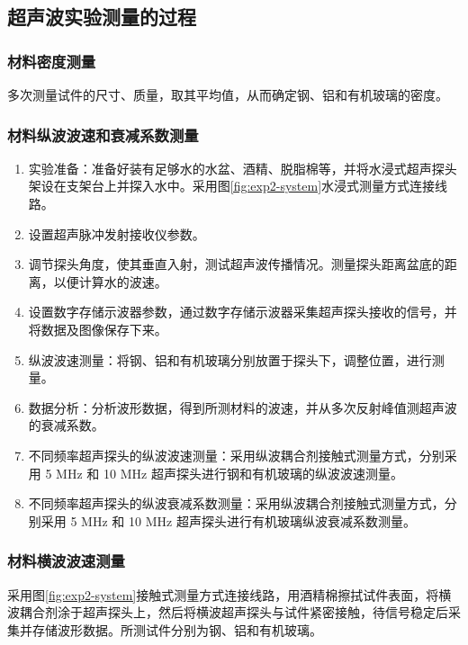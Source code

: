 \documentclass[UTF8,a4paper,12pt]{ctexart}
\numberwithin{equation}{section}
\begin{document}
\subsection{超声波实验测量的过程}
\subsubsection{材料密度测量}
多次测量试件的尺寸、质量，取其平均值，从而确定钢、铝和有机玻璃的密度。

\subsubsection{材料纵波波速和衰减系数测量}
\begin{enumerate}
  \item 实验准备：准备好装有足够水的水盆、酒精、脱脂棉等，并将水浸式超声探头架设在支架台上并探入水中。采用图\ref{fig:exp2-system}水浸式测量方式连接线路。
  \item 设置超声脉冲发射接收仪参数。
  \item 调节探头角度，使其垂直入射，测试超声波传播情况。测量探头距离盆底的距离，以便计算水的波速。
  \item 设置数字存储示波器参数，通过数字存储示波器采集超声探头接收的信号，并将数据及图像保存下来。
  \item 纵波波速测量：将钢、铝和有机玻璃分别放置于探头下，调整位置，进行测量。
  \item 数据分析：分析波形数据，得到所测材料的波速，并从多次反射峰值测超声波的衰减系数。
  \item 不同频率超声探头的纵波波速测量：采用纵波耦合剂接触式测量方式，分别采用 5 MHz 和 10 MHz 超声探头进行钢和有机玻璃的纵波波速测量。
  \item 不同频率超声探头的纵波衰减系数测量：采用纵波耦合剂接触式测量方式，分别采用 5 MHz 和 10 MHz 超声探头进行有机玻璃纵波衰减系数测量。
\end{enumerate}

\subsubsection{材料横波波速测量}
采用图\ref{fig:exp2-system}接触式测量方式连接线路，用酒精棉擦拭试件表面，将横波耦合剂涂于超声探头上，然后将横波超声探头与试件紧密接触，待信号稳定后采集并存储波形数据。所测试件分别为钢、铝和有机玻璃。
\end{document}
